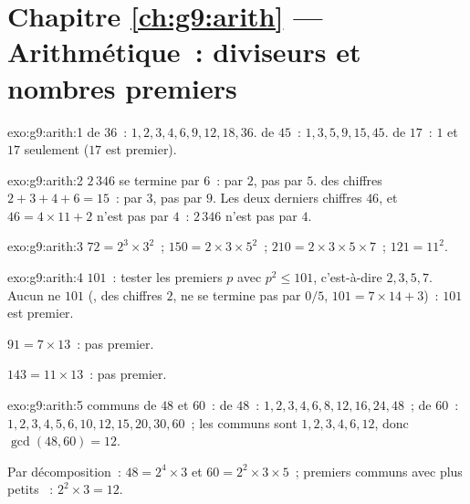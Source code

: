 \section*{Chapitre \ref{ch:g9:arith} --- Arithmétique~: diviseurs et nombres premiers}

\begin{solution}{exo:g9:arith:1}
 de $36$~: $1, 2, 3, 4, 6, 9, 12, 18, 36$.
 de $45$~: $1, 3, 5, 9, 15, 45$.
 de $17$~: $1$ et $17$ seulement ($17$ est premier).
\end{solution}

\begin{solution}{exo:g9:arith:2}
$2\,346$ se termine par $6$~:  par $2$, pas par $5$.  des
chiffres $2 + 3 + 4 + 6 = 15$~:  par $3$, pas par $9$. Les
deux derniers chiffres $46$, et $46 = 4 \times 11 + 2$ n'est pas
 par $4$~: $2\,346$ n'est pas  par $4$.
\end{solution}

\begin{solution}{exo:g9:arith:3}
$72 = 2^3 \times 3^2$~; \quad
$150 = 2 \times 3 \times 5^2$~; \quad
$210 = 2 \times 3 \times 5 \times 7$~; \quad
$121 = 11^2$.
\end{solution}

\begin{solution}{exo:g9:arith:4}
$101$~: tester les premiers $p$ avec $p^2 \leq 101$, c'est-à-dire $2,
3, 5, 7$. Aucun ne  $101$ (,  des chiffres $2$, ne se
termine pas par $0/5$, $101 = 7 \times 14 + 3$)~: $101$ est premier.

$91 = 7 \times 13$~: pas premier.

$143 = 11 \times 13$~: pas premier.
\end{solution}

\begin{solution}{exo:g9:arith:5}
 communs de $48$ et $60$~:  de $48$~: $1, 2, 3, 4, 6,
8, 12, 16, 24, 48$~;  de $60$~: $1, 2, 3, 4, 5, 6, 10, 12, 15,
20, 30, 60$~; les communs sont $1, 2, 3, 4, 6, 12$, donc
$\gcd(48,60) = 12$.

Par décomposition~: $48 = 2^4 \times 3$ et $60 = 2^2 \times 3 \times 5$~;
premiers communs avec plus petits ~: $2^2 \times 3 = 12$.
\end{solution}

